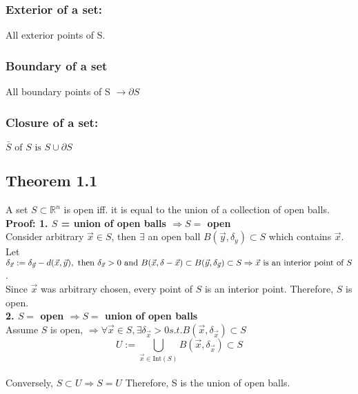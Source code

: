 \documentclass[11pt, a4paper]{article}
\begin{document}
        \subsubsection{Exterior of a set:} All exterior points of S.
        \subsubsection{Boundary of a set} All boundary points of S $\rightarrow \partial S$
        \subsubsection{Closure of a set:} $\bar{S} \text{ of } S \text{ is } S \cup \partial S$
    \subsection{Theorem 1.1}
    A set $S \subset \mathbb{R}^n$ is open iff. it is equal to the union of a collection of open balls. \\
        \textbf{Proof: 1. $S$ = union of open balls $\Rightarrow S =$ open}  \\
        Consider arbitrary $\vec{x} \in S$, then $\exists$ an open ball $B(\vec{y}, \delta_y) \subset S$ which contains $\vec{x}$. Let $\delta_{\vec{x}} := \delta_{\vec{y}} -d(\vec{x}, \vec{y}), \text{ then } \delta_{\vec{x}} > 0 \text{ and } B(\vec{x}, \delta-{\vec{x}}) \subset B(\vec{y}, \delta_{\vec{y}}) \subset S \\ \Rightarrow \vec{x} \text{ is an interior point of } S$. \\
        Since $\vec{x}$ was arbitrary chosen, every point of $S$ is an interior point. Therefore, $S$ is open. \\
        \textbf{2. $S =$ open $\Rightarrow S =$ union of open balls} \\
        Assume $S$ is open, $\Rightarrow \forall \vec{x} \in S, \exists \delta_{\vec{x}} > 0 s.t. B(\vec{x}, \delta_{\vec{x}}) \subset S$ \\
        $$U := \bigcup\limits_{\vec{x} \in \mathrm{Int}(S)} B(\vec{x}, \delta_{\vec{x}}) \subset S$$ \\
        Conversely, $S \subset U \Rightarrow S = U$
        Therefore, S is the union of open balls.
\end{document}
